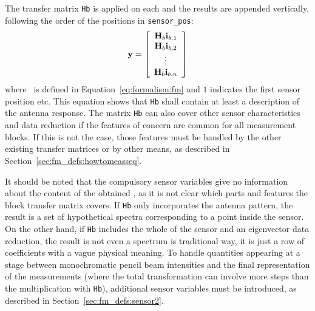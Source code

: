The transfer matrix \verb|Hb| is applied on each  and the
results are appended vertically, following the order of the positions
in \verb|sensor_pos|:
\begin{equation}
  \mathbf{y} = \left[ \begin{array}{c} \mathbf{H}_{b}\mathbf{i}_{{b,1}} \\ 
                                    \mathbf{H}_{b}\mathbf{i}_{{b,2}} \\
                                    \vdots                  \\
                                    \mathbf{H}_{b}\mathbf{i}_{{b,n}} 
            \end{array} \right]
  \label{eq:fm_defs:measseq}
\end{equation}
where \MsrVct\ is defined in Equation~\ref{eq:formalism:fm} and $1$
indicates the first sensor position etc. This equation shows that
\verb|Hb| shall contain at least a description of the antenna
response. The matrix \verb|Hb| can also cover other sensor
characteristics and data reduction if the features of concern are
common for all measurement blocks. If this is not the case, those
features must be handled by the other existing transfer matrices or by
other means, as described in Section~\ref{sec:fm_defs:howtomeasseq}.

It should be noted that the compulsory sensor variables give no
information about the content of the obtained \MsrVct, as it is not
clear which parts and features the block transfer matrix covers. If
\verb|Hb| only incorporates the antenna pattern, the result is a set
of hypothetical spectra corresponding to a point inside the sensor. On
the other hand, if \verb|Hb| includes the whole of the sensor and an
eigenvector data reduction, the result is not even a spectrum is
traditional way, it is just a row of coefficients with a vague
physical meaning. To handle quantities appearing at a stage between
monochromatic pencil beam intensities and the final representation of
the measurements (where the total transformation can involve more
steps than the multiplication with \verb|Hb|), additional sensor
variables must be introduced, as described in
Section~\ref{sec:fm_defs:sensor2}.


\label{sec:fm_defs:rte}

\newcommand{\Int}{{\bf I}}
\newcommand{\Ext}{{\bf K}}
\newcommand{\Abs}{{\bf a}}
\newcommand{\Sca}{{\bf Y}}
\newcommand{\Dir}{{\bf n}}
\newcommand{\Path}{{\bf s}}
\newcommand{\Freq}{\nu}
\newcommand{\Dep}{(\Dir,\Freq)}

